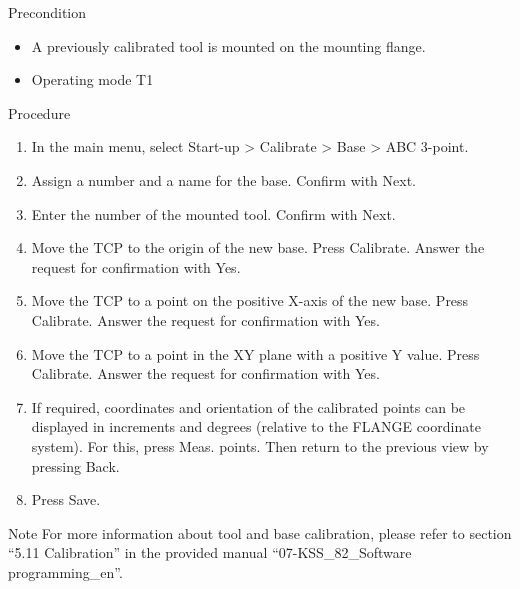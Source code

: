 		Precondition
		\begin{itemize}
			\item A previously calibrated tool is mounted on the mounting flange.
			\item Operating mode T1
		\end{itemize}
		
		Procedure
		\begin{enumerate}
			\item In the main menu, select Start-up > Calibrate > Base > ABC 3-point.
			\item Assign a number and a name for the base. Confirm with Next.
			\item Enter the number of the mounted tool. Confirm with Next.
			\item Move the TCP to the origin of the new base. Press Calibrate. Answer the request for confirmation with Yes.
			\item Move the TCP to a point on the positive X-axis of the new base. Press Calibrate. Answer the request for confirmation with Yes.
			\item Move the TCP to a point in the XY plane with a positive Y value. Press Calibrate. Answer the request for confirmation with Yes.
			\item If required, coordinates and orientation of the calibrated points can be displayed in increments and degrees (relative to the FLANGE coordinate system). For this, press Meas. points. Then return to the previous view by pressing Back.
			\item Press Save.
		\end{enumerate}
		
    \begin{mynotebox}{Note}
        For more information about tool and base calibration, please refer to section “5.11 Calibration” in the provided manual “07-KSS\_82\_Software programming\_en”.
    \end{mynotebox}
    
    
		\newpage
